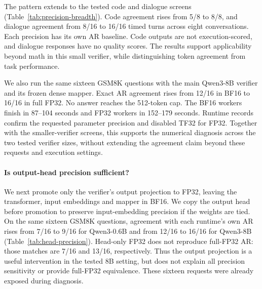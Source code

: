 \documentclass{article}
\begin{document}
The pattern extends to the tested code and dialogue screens
(Table~\ref{tab:precision-breadth}). Code agreement rises from 5/8 to
8/8, and dialogue agreement from 8/16 to 16/16 timed turns across eight
conversations. Each precision has its own AR baseline. Code outputs are
not execution-scored, and dialogue responses have no quality scores.
The results support applicability beyond math in this small verifier,
while distinguishing token agreement from task performance.

\begin{table}[H]
\centering\small

\caption{Qwen3-0.6B precision diagnostics with the frozen dense mapper.
Units are questions or whole conversations. AR matches count timed turns.
Paired intervals resample the units within each precision. GSM8K and
code use 512-token caps, dialogue uses 256 tokens per turn.}
\label{tab:precision-breadth}
\end{table}

We also run the same sixteen GSM8K questions with the main Qwen3-8B
verifier and its frozen dense mapper. Exact AR agreement rises from
12/16 in BF16 to 16/16 in full FP32. No answer reaches the 512-token
cap. The BF16 workers finish in 87--104 seconds and FP32 workers in
152--179 seconds. Runtime records confirm the requested parameter
precision and disabled TF32 for FP32. Together with the smaller-verifier
screens, this supports the numerical diagnosis across the two tested
verifier sizes, without extending the agreement claim beyond these
requests and execution settings.

\paragraph{Is output-head precision sufficient?}
We next promote only the verifier's output projection to FP32, leaving
the transformer, input embeddings and mapper in BF16. We copy the
output head before promotion to preserve input-embedding precision if
the weights are tied. On the same sixteen GSM8K questions, agreement
with each runtime's own AR rises from 7/16 to 9/16 for Qwen3-0.6B and
from 12/16 to 16/16 for Qwen3-8B (Table~\ref{tab:head-precision}).
Head-only FP32 does not reproduce full-FP32 AR: those matches are 7/16
and 13/16, respectively. Thus the output projection is a useful
intervention in the tested 8B setting, but does not explain all
precision sensitivity or provide full-FP32 equivalence. These sixteen
requests were already exposed during diagnosis.
\end{document}
